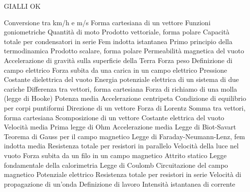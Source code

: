 \documentclass[a4paper,11pt,italian]{article}
\begin{document}
GIALLI OK
\begin{enumerate}
{Conversione tra km/h e m/s}
{Forma cartesiana di un vettore}
{Funzioni goniometriche}
{Quantità di moto}
{Prodotto vettoriale, forma polare}
{Capacità totale per condensatori in serie}
{Fem indotta istantanea}
{Primo principio della termodinamica}
{Prodotto scalare, forma polare}
{Permeabilità magnetica del vuoto}
{Accelerazione di gravità sulla superficie della Terra }
{Forza peso}
{Definizione di campo elettrico}
{Forza subita da una carica in un campo elettrico}
{Pressione }
{Costante dielettrica del vuoto}
{Energia potenziale elettrica di un sistema di due cariche}
{Differenza tra vettori, forma cartesiana}
{Forza di richiamo di una molla (legge di Hooke)}
{Potenza media}
{Accelerazione centripeta}
{Condizione di equilibrio per corpi puntiformi}
{Direzione di un vettore }
{Forza di Lorentz}
{Somma tra vettori, forma cartesiana}
{Scomposizione di un vettore}
{Costante elettrica del vuoto }
{Velocità media}
{Prima legge di Ohm}
{Accelerazione media}
{Legge di Biot-Savart}
{Teorema di Gauss per il campo magnetico}
{Legge di Faraday-Neumann-Lenz, fem indotta media}
{Resistenza totale per resistori in parallelo}
{Velocità della luce nel vuoto}
{Forza subita da un filo in un campo magnetico}
{Attrito statico}
{Legge fondamentale della calorimetria}
{Legge di Coulomb}
{Circuitazione del campo magnetico}
{Potenziale elettrico}
{Resistenza totale per resistori in serie}
{Velocità di propagazione di un'onda}
{Definizione di lavoro}
{Intensità istantanea di corrente}
\end{enumerate}
\end{document}
